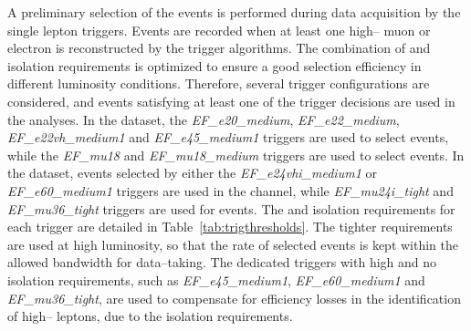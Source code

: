 A preliminary selection of the events is performed during data
acquisition by the single lepton triggers. Events are recorded when at
least one high--\pt{} muon or electron is reconstructed by the trigger
algorithms. 
The combination of \pt{} and isolation requirements is optimized to ensure
a good selection efficiency in different luminosity
conditions.
Therefore, several trigger configurations are
considered, and events satisfying at least one of the trigger
decisions are used in the analyses.
In the \seventev{} dataset, the {\it EF\_e20\_medium}, {\it
  EF\_e22\_medium}, {\it EF\_e22vh\_medium1} and {\it EF\_e45\_medium1}
triggers are used to select \ejets{} events, while the {\it
  EF\_mu18} and {\it EF\_mu18\_medium} triggers are used to select
\mujets{} events. In the \eighttev{} dataset, events selected by either the {\it
  EF\_e24vhi\_medium1} or {\it EF\_e60\_medium1} triggers are used in the
\ejets{} channel, while {\it EF\_mu24i\_tight} and {\it
  EF\_mu36\_tight} triggers are used for \mujets{} events.
The \pt{} and isolation requirements for each trigger are detailed in
Table~\ref{tab:trigthresholds}. 
The tighter requirements are used at high luminosity, so that
the rate of selected events is kept within the allowed bandwidth for
data--taking. The dedicated triggers with high \pt{} and no
isolation requirements, such as {\it EF\_e45\_medium1}, {\it
  EF\_e60\_medium1} and {\it EF\_mu36\_tight}, are used to compensate
for efficiency losses in the identification of high--\pt{} leptons,
due to the isolation requirements.
